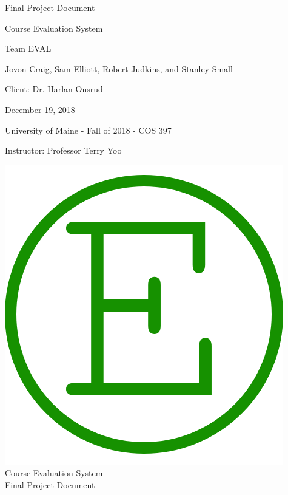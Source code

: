 \documentclass{article}
\begin{document}
\begin{titlepage}


\centering
\vspace*{2cm}
{\Huge Final Project Document\par}
\vspace{.25cm}
{\LARGE Course Evaluation System\par}
\vspace{1cm}
{\Large Team EVAL\par}
\vspace{.2cm}
{\Large Jovon Craig, Sam Elliott, Robert Judkins, and Stanley Small\par}
\vspace{1cm}
{\Large Client: Dr. Harlan Onsrud\par}
\vspace{1cm}
{\Large December 19, 2018\par}
\vspace{11cm}

University of Maine - Fall of 2018 - COS 397

Instructor: Professor Terry Yoo

\end{titlepage}

\newpage

\begin{center}
{\includegraphics[scale=.2]{images/team_logo.png}} \\ 	\bigskip
{\LARGE Course Evaluation System } \\ \medskip
{\large Final Project Document } \\ \medskip
\end{center}
\end{document}

